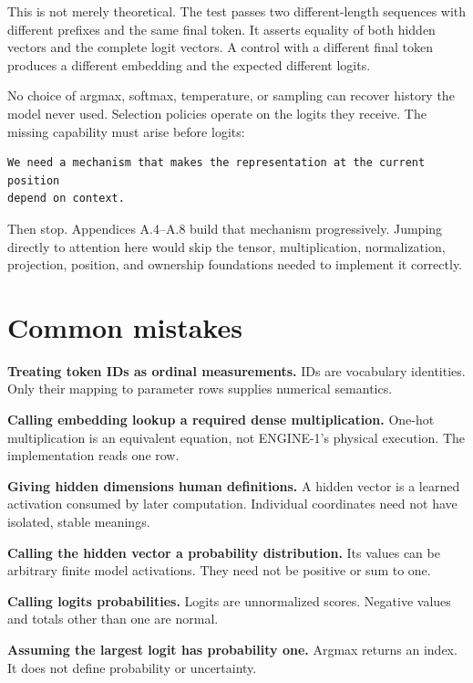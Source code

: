 This is not merely theoretical. The test
\texttt{}
passes two different-length sequences with different prefixes and the
same final token. It asserts equality of both hidden vectors and the
complete logit vectors. A control with a different final token produces
a different embedding and the expected different logits.

No choice of argmax, softmax, temperature, or sampling can recover
history the model never used. Selection policies operate on the logits
they receive. The missing capability must arise before logits:

\begin{verbatim}
We need a mechanism that makes the representation at the current position
depend on context.
\end{verbatim}

Then stop. Appendices A.4--A.8 build that mechanism progressively. Jumping
directly to attention here would skip the tensor, multiplication,
normalization, projection, position, and ownership foundations needed to
implement it correctly.

\section{Common mistakes}\label{common-mistakes-2}

\textbf{Treating token IDs as ordinal measurements.} IDs are vocabulary
identities. Only their mapping to parameter rows supplies numerical
semantics.

\textbf{Calling embedding lookup a required dense multiplication.}
One-hot multiplication is an equivalent equation, not ENGINE-1's
physical execution. The implementation reads one row.

\textbf{Giving hidden dimensions human definitions.} A hidden vector is
a learned activation consumed by later computation. Individual
coordinates need not have isolated, stable meanings.

\textbf{Calling the hidden vector a probability distribution.} Its
values can be arbitrary finite model activations. They need not be
positive or sum to one.

\textbf{Calling logits probabilities.} Logits are unnormalized scores.
Negative values and totals other than one are normal.

\textbf{Assuming the largest logit has probability one.} Argmax returns
an index. It does not define probability or uncertainty.

